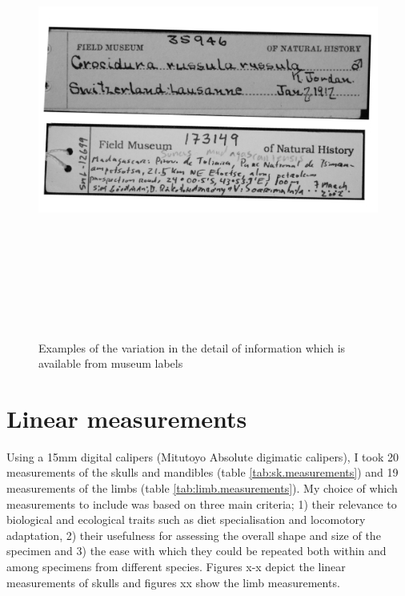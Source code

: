 \begin{figure} 
  \centering
  \includegraphics[width = 15cm, height = 15cm, keepaspectratio=true]{Methods/figures/labels.png}
    \caption[Examples of museum labels]%
    {Examples of the variation in the detail of information which is available from museum labels}%
  \label{fig:museum.labels}
  \end{figure}
  
\section{Linear measurements}

Using a 15mm digital calipers (Mitutoyo Absolute digimatic calipers), I took 20 measurements of the skulls and mandibles (table \ref{tab:sk.measurements}) and 19 measurements of the limbs (table \ref{tab:limb.measurements}). My choice of which measurements to include was based on three main criteria; 1) their relevance to biological and ecological traits such as diet specialisation and locomotory adaptation, 2) their usefulness for assessing the overall shape and size of the specimen and 3) the ease with which they could be repeated both within and among specimens from different species. 
Figures x-x depict the linear measurements of skulls and figures xx show the limb measurements.

